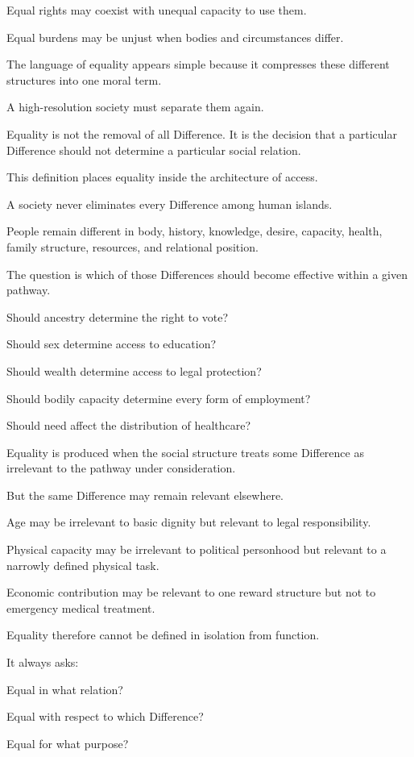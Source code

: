 Equal rights may coexist with unequal capacity to use them.

Equal burdens may be unjust when bodies and circumstances differ.

The language of equality appears simple because it compresses these different structures into one moral term.

A high-resolution society must separate them again.

Equality is not the removal of all Difference. It is the decision that a particular Difference should not determine a particular social relation.

This definition places equality inside the architecture of access.

A society never eliminates every Difference among human islands.

People remain different in body, history, knowledge, desire, capacity, health, family structure, resources, and relational position.

The question is which of those Differences should become effective within a given pathway.

Should ancestry determine the right to vote?

Should sex determine access to education?

Should wealth determine access to legal protection?

Should bodily capacity determine every form of employment?

Should need affect the distribution of healthcare?

Equality is produced when the social structure treats some Difference as irrelevant to the pathway under consideration.

But the same Difference may remain relevant elsewhere.

Age may be irrelevant to basic dignity but relevant to legal responsibility.

Physical capacity may be irrelevant to political personhood but relevant to a narrowly defined physical task.

Economic contribution may be relevant to one reward structure but not to emergency medical treatment.

Equality therefore cannot be defined in isolation from function.

It always asks:

Equal in what relation?

Equal with respect to which Difference?

Equal for what purpose?

